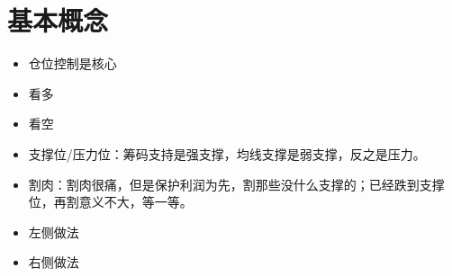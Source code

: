 \section{基本概念}
\begin{itemize}
\item 仓位控制是核心
\item 看多
\item 看空
\item 支撑位/压力位：筹码支持是强支撑，均线支撑是弱支撑，反之是压力。
\item 割肉：割肉很痛，但是保护利润为先，割那些没什么支撑的；已经跌到支撑位，再割意义不大，等一等。
\item 左侧做法
\item 右侧做法
\end{itemize}








